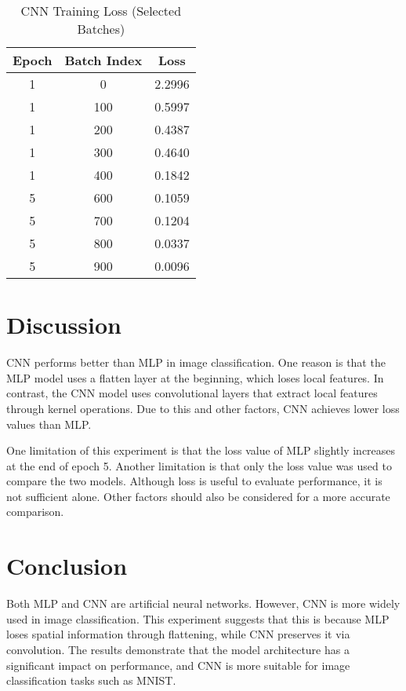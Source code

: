 \documentclass[conference]{IEEEtran}
\begin{document}
\begin{table}[htbp]
\caption{CNN Training Loss (Selected Batches)}
\begin{center}
\begin{tabular}{|c|c|c|}
\hline
\textbf{Epoch} & \textbf{Batch Index} & \textbf{Loss} \\
\hline
1 & 0   & 2.2996 \\
1 & 100 & 0.5997 \\
1 & 200 & 0.4387 \\
1 & 300 & 0.4640 \\
1 & 400 & 0.1842 \\
\hline
5 & 600 & 0.1059 \\
5 & 700 & 0.1204 \\
5 & 800 & 0.0337 \\
5 & 900 & 0.0096 \\
\hline
\end{tabular}
\label{tab:cnn_loss}
\end{center}
\end{table}




\section{Discussion}
CNN performs better than MLP in image classification. One reason is that the MLP model uses a flatten layer at the beginning, which loses local features. In contrast, the CNN model uses convolutional layers that extract local features through kernel operations. Due to this and other factors, CNN achieves lower loss values than MLP.

One limitation of this experiment is that the loss value of MLP slightly increases at the end of epoch 5. Another limitation is that only the loss value was used to compare the two models. Although loss is useful to evaluate performance, it is not sufficient alone. Other factors should also be considered for a more accurate comparison.

\section*{Conclusion}
Both MLP and CNN are artificial neural networks. However, CNN is more widely used in image classification. This experiment suggests that this is because MLP loses spatial information through flattening, while CNN preserves it via convolution. The results demonstrate that the model architecture has a significant impact on performance, and CNN is more suitable for image classification tasks such as MNIST.
\end{document}
